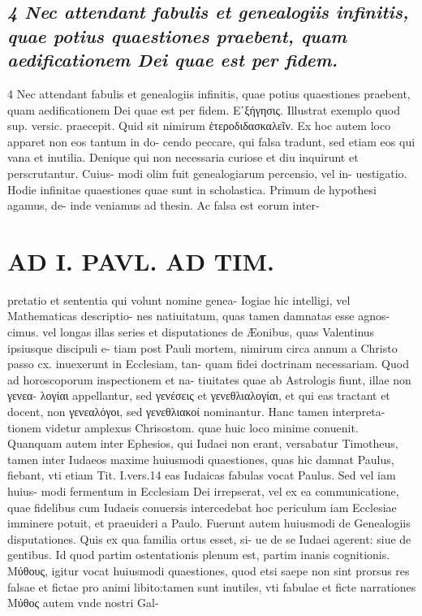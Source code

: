 \documentclass{article}
\begin{document}
\begin{pages}
\subsection*{\textit{4 Nec attendant fabulis et genealogiis infinitis, quae potius quaestiones praebent, quam aedificationem Dei quae est per fidem.}}4 Nec attendant fabulis et genealogiis infinitis, quae potius quaestiones praebent, quam aedificationem Dei quae est per fidem. Εʹξήγησις. Illustrat exemplo quod sup. versic. praecepit. Quid sit nimirum ἑτεροδιδασκαλεῖν. Ex hoc autem loco apparet non eos tantum in do- cendo peccare, qui falsa tradunt, sed etiam eos qui vana et inutilia. Denique qui non necessaria curiose et diu inquirunt et perscrutantur. Cuius- modi olim fuit genealogiarum percensio, vel in- uestigatio. Hodie infinitae quaestiones quae sunt in scholastica. Primum de hypothesi agamus, de- inde veniamus ad thesin. Ac falsa est eorum inter-  \pend
\section*{AD I. PAVL. AD TIM. }
\marginpar{[ p.1O ]}\pstart pretatio et sententia qui volunt nomine genea- Iogiae hic intelligi, vel Mathematicas descriptio- nes natiuitatum, quas tamen damnatas esse agnos- cimus. vel longas illas series et disputationes de Æonibus, quas Valentinus ipsiusque discipuli e- tiam post Pauli mortem, nimirum circa annum a Christo passo cx. inuexerunt in Ecclesiam, tan- quam fidei doctrinam necessariam. Quod ad horoscoporum inspectionem et na- tiuitates quae ab Astrologis fiunt, illae non γενεα- λογίαι appellantur, sed γενέσεις et γενεθλιαλογίαι, et qui eas tractant et docent, non γενεαλόγοι, sed γενεθλιακοί nominantur. Hanc tamen interpreta- tionem videtur amplexus Chrisostom. quae huic loco minime conuenit. Quanquam autem inter Ephesios, qui Iudaei non erant, versabatur Timotheus, tamen inter Iudaeos maxime huiusmodi quaestiones, quas hic damnat Paulus, fiebant, vti etiam Tit. I.vers.14 eas Iudaicas fabulas vocat Paulus. Sed vel iam huius- modi fermentum in Ecclesiam Dei irrepserat, vel ex ea communicatione, quae fidelibus cum Iudaeis conuersis intercedebat hoc periculum iam Ecclesiae imminere potuit, et praeuideri a Paulo. Fuerunt autem huiusmodi de Genealogiis disputationes. Quis ex qua familia ortus esset, si- ue de se Iudaei agerent: siue de gentibus. Id quod partim ostentationis plenum est, partim inanis cognitionis. Μύθους, igitur vocat huiusmodi quaestiones, quod etsi saepe non sint prorsus res falsae et fictae pro animi libito:tamen sunt inutiles, vti fabulae et ficte narrationes Μύθος autem vnde nostri Gal-  \pend

\end{pages}
\end{document}

